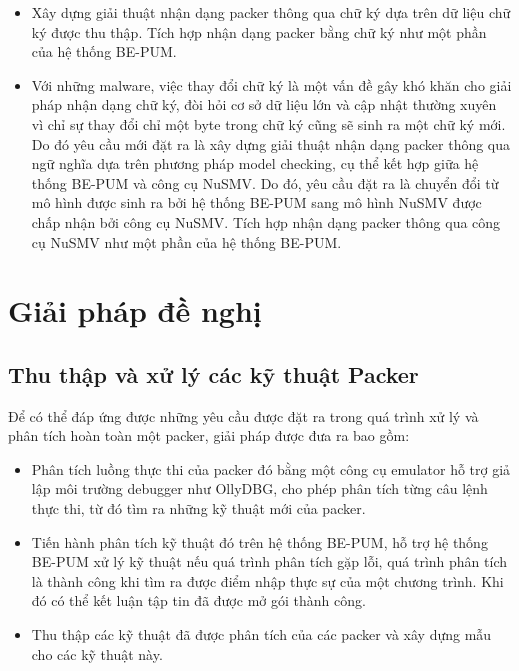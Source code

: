 \begin{itemize}
\item{Xây dựng giải thuật nhận dạng packer thông qua chữ ký dựa trên dữ liệu chữ ký được thu thập. Tích hợp nhận dạng packer bằng chữ ký như một phần của hệ thống BE-PUM.\\}
\item{Với những malware, việc thay đổi chữ ký là một vấn đề gây khó khăn cho giải pháp nhận dạng chữ ký, đòi hỏi cơ sở dữ liệu lớn và cập nhật thường xuyên vì chỉ sự thay đổi chỉ một byte trong chữ ký cũng sẽ sinh ra một chữ ký mới. Do đó yêu cầu mới đặt ra là xây dựng giải thuật nhận dạng packer thông qua ngữ nghĩa dựa trên phương pháp model checking, cụ thể kết hợp giữa hệ thống BE-PUM và công cụ NuSMV. Do đó, yêu cầu đặt ra là chuyển đổi từ mô hình được sinh ra bởi hệ thống BE-PUM sang mô hình NuSMV được chấp nhận bởi công cụ NuSMV. Tích hợp nhận dạng packer thông qua công cụ NuSMV như một phần của hệ thống BE-PUM.}
\end{itemize}

\section{Giải pháp đề nghị}

\subsection {Thu thập và xử lý các kỹ thuật Packer}

\hspace{0.5cm}Để có thể đáp ứng được những yêu cầu được đặt ra trong quá trình xử lý và phân tích hoàn toàn một packer, giải pháp được đưa ra bao gồm:

\begin{itemize}
\item{Phân tích luồng thực thi của packer đó bằng một công cụ emulator hỗ trợ giả lập môi trường debugger như OllyDBG, cho phép phân tích từng câu lệnh thực thi, từ đó tìm ra những kỹ thuật mới của packer.\\}
\item{Tiến hành phân tích kỹ thuật đó trên hệ thống BE-PUM, hỗ trợ hệ thống BE-PUM xử lý kỹ thuật nếu quá trình phân tích gặp lỗi, quá trình phân tích là thành công khi tìm ra được điểm nhập thực sự của một chương trình. Khi đó có thể kết luận tập tin đã được mở gói thành công.\\}
\item{Thu thập các kỹ thuật đã được phân tích của các packer và xây dựng mẫu cho các kỹ thuật này.}
\end{itemize} 

